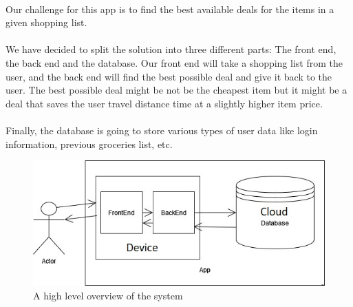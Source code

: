 
\\Our challenge for this app is to find the best available deals for the items in a given shopping list.\\
\\We have decided to split the solution into three different parts: The front end, the back end and the database. Our front end will take a shopping list from the user, and the back end will find the best possible deal and give it back to the user. The best possible deal might be not be the cheapest item but it might be a deal that saves the user travel distance time at a slightly higher item price.\\
\\Finally, the database is going to store various types of user data like login information, previous groceries list, etc.
\begin{figure}[h!]
    \includegraphics{images/system diagram.jpg}
    \caption{A high level overview of the system}
\end{figure}

